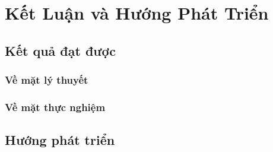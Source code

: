 \def\baselinestretch{1}
\chapter{Kết Luận và Hướng Phát Triển}
\ifpdf
    \graphicspath{{Conclusions/ConclusionsFigs/PNG/}{Conclusions/ConclusionsFigs/PDF/}{Conclusions/ConclusionsFigs/}}
\else
    \graphicspath{{Conclusions/ConclusionsFigs/EPS/}{Conclusions/ConclusionsFigs/}}
\fi

\def\baselinestretch{1.66}

\section{Kết quả đạt được}
\subsection{Về mặt lý thuyết}
\subsection{Về mặt thực nghiệm}
\section{Hướng phát triển}



